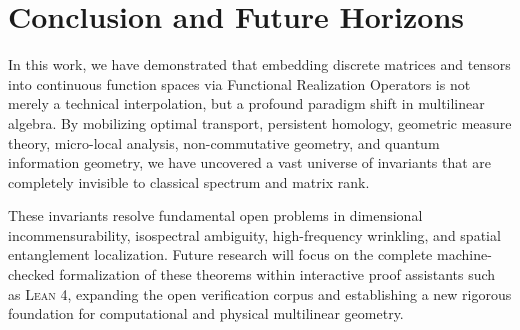 \documentclass[11pt,a4paper,reqno]{amsart}
\theoremstyle{definition}
\numberwithin{equation}{section}
\begin{document}
\section{Conclusion and Future Horizons}
\label{sec:conclusion}

In this work, we have demonstrated that embedding discrete matrices and tensors into continuous function spaces via Functional Realization Operators is not merely a technical interpolation, but a profound paradigm shift in multilinear algebra. By mobilizing optimal transport, persistent homology, geometric measure theory, micro-local analysis, non-commutative geometry, and quantum information geometry, we have uncovered a vast universe of invariants that are completely invisible to classical spectrum and matrix rank.

These invariants resolve fundamental open problems in dimensional incommensurability, isospectral ambiguity, high-frequency wrinkling, and spatial entanglement localization. Future research will focus on the complete machine-checked formalization of these theorems within interactive proof assistants such as \textsc{Lean 4}, expanding the open verification corpus and establishing a new rigorous foundation for computational and physical multilinear geometry.
\end{document}
